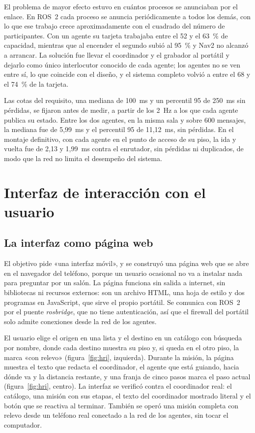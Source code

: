 El problema de mayor efecto estuvo en cuántos procesos se anunciaban por el enlace. En ROS~2 cada proceso se anuncia periódicamente a todos los demás, con lo que ese trabajo crece aproximadamente con el cuadrado del número de participantes. Con un agente su tarjeta trabajaba entre el 52 y el 63~\% de capacidad, mientras que al encender el segundo subió al 95~\% y Nav2 no alcanzó a arrancar. La solución fue llevar el coordinador y el grabador al portátil y dejarlo como único interlocutor conocido de cada agente; los agentes no se ven entre sí, lo que coincide con el diseño, y el sistema completo volvió a entre el 68 y el 74~\% de la tarjeta.

Las cotas del requisito, una mediana de 100~ms y un percentil 95 de 250~ms sin pérdidas, se fijaron antes de medir, a partir de los 2~Hz a los que cada agente publica su estado. Entre los dos agentes, en la misma sala y sobre 600 mensajes, la mediana fue de 5,99~ms y el percentil 95 de 11,12~ms, sin pérdidas. En el montaje definitivo, con cada agente en el punto de acceso de su piso, la ida y vuelta fue de 2,13 y 1,99~ms contra el enrutador, sin pérdidas ni duplicados, de modo que la red no limita el desempeño del sistema.

\section{Interfaz de interacción con el usuario}
\label{sec:oe3}

\subsection{La interfaz como página web}

El objetivo pide «una interfaz móvil», y se construyó una página web que se abre en el navegador del teléfono, porque un usuario ocasional no va a instalar nada para preguntar por un salón. La página funciona sin salida a internet, sin bibliotecas ni recursos externos: son un archivo HTML, una hoja de estilo y dos programas en JavaScript, que sirve el propio portátil. Se comunica con ROS~2 por el puente \textit{rosbridge}, que no tiene autenticación, así que el firewall del portátil solo admite conexiones desde la red de los agentes.

El usuario elige el origen en una lista y el destino en un catálogo con búsqueda por nombre, donde cada destino muestra su piso y, si queda en el otro piso, la marca «con relevo» (figura~\ref{fig:hri}, izquierda). Durante la misión, la página muestra el texto que redacta el coordinador, el agente que está guiando, hacia dónde va y la distancia restante, y una franja de cinco pasos marca el paso actual (figura~\ref{fig:hri}, centro). La interfaz se verificó contra el coordinador real: el catálogo, una misión con sus etapas, el texto del coordinador mostrado literal y el botón que se reactiva al terminar. También se operó una misión completa con relevo desde un teléfono real conectado a la red de los agentes, sin tocar el computador.

